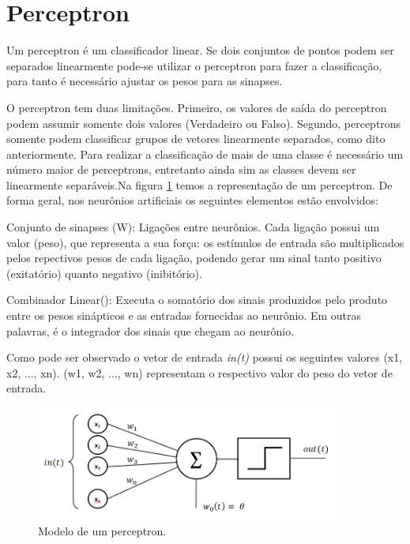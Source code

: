 \documentclass[12pt,journal,onecolumn]{IEEEtran}
\begin{document}
\section{Perceptron}
Um perceptron é um classificador linear. Se dois conjuntos de pontos podem ser
separados linearmente pode-se utilizar o perceptron para fazer a classificação,
para tanto é necessário ajustar os pesos para as sinapses. 

O perceptron tem duas limitações. Primeiro, os valores de saída do perceptron
podem assumir somente dois valores (Verdadeiro ou Falso). Segundo, perceptrons
somente podem classificar grupos de vetores linearmente separados, como dito
anteriormente. Para realizar a classificação de mais de uma classe é
necessário um número maior de perceptrons, entretanto ainda sim as classes
devem ser linearmente separáveis.Na figura \ref{fig:perceptron} temos a
representação de um perceptron.
De forma geral, nos neurônios artificiais os seguintes elementos estão
envolvidos:

Conjunto de sinapses (W): Ligações entre neurônios. Cada ligação possui um valor
(peso), que representa a sua força: os estímulos de entrada são multiplicados
pelos repectivos pesos de cada ligação, podendo gerar um sinal tanto positivo
(exitatório) quanto negativo (inibitório).

Combinador Linear(): Executa o somatório dos sinais produzidos pelo produto
entre os pesos sinápticos e as entradas fornecidas ao neurônio. Em outras
palavras, é o integrador dos sinais que chegam ao neurônio.

Como pode ser observado o vetor de entrada \textit{in(t)} possui os
seguintes valores (x1, x2, ..., xn). (w1, w2, ..., wn) representam o respectivo
valor do peso do vetor de entrada.


\begin{figure}[h]
	\centering
	\includegraphics[width=10cm]{images/perceptron.png}
	\caption{Modelo de um perceptron.}
	\label{fig:perceptron}
\end{figure}
\end{document}

